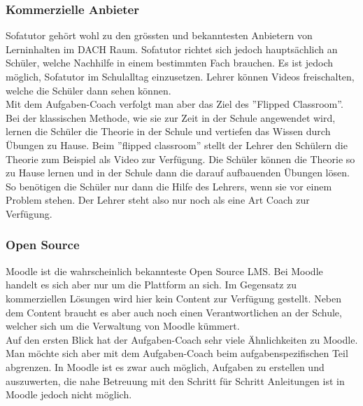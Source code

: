 \subsubsection{Kommerzielle Anbieter}
Sofatutor gehört wohl zu den grössten und bekanntesten Anbietern von Lerninhalten im DACH Raum. Sofatutor richtet sich jedoch hauptsächlich an Schüler, welche Nachhilfe in einem bestimmten Fach brauchen. Es ist jedoch möglich, Sofatutor im Schulalltag einzusetzen. Lehrer können Videos freischalten, welche die Schüler dann sehen können. \\

\noindent Mit dem Aufgaben-Coach verfolgt man aber das Ziel des ''Flipped Classroom''. Bei der klassischen Methode, wie sie zur Zeit in der Schule angewendet wird, lernen die Schüler die Theorie in der Schule und vertiefen das Wissen durch Übungen zu Hause. Beim ''flipped classroom'' stellt der Lehrer den Schülern die Theorie zum Beispiel als Video zur Verfügung. Die Schüler können die Theorie so zu Hause lernen und in der Schule dann die darauf aufbauenden Übungen lösen. So benötigen die Schüler nur dann die Hilfe des Lehrers, wenn sie vor einem Problem stehen. Der Lehrer steht also nur noch als eine Art Coach zur Verfügung. 

\subsubsection{Open Source}
Moodle ist die wahrscheinlich bekannteste Open Source LMS. Bei Moodle handelt es sich aber nur um die Plattform an sich. Im Gegensatz zu kommerziellen Lösungen wird hier kein Content zur Verfügung gestellt. Neben dem Content braucht es aber auch noch einen Verantwortlichen an der Schule, welcher sich um die Verwaltung von Moodle kümmert. \\

\noindent Auf den ersten Blick hat der Aufgaben-Coach sehr viele Ähnlichkeiten zu Moodle. Man möchte sich aber mit dem Aufgaben-Coach beim aufgabenspezifischen Teil abgrenzen. In Moodle ist es zwar auch möglich, Aufgaben zu erstellen und auszuwerten, die nahe Betreuung mit den Schritt für Schritt Anleitungen ist in Moodle jedoch nicht möglich.













\newpage